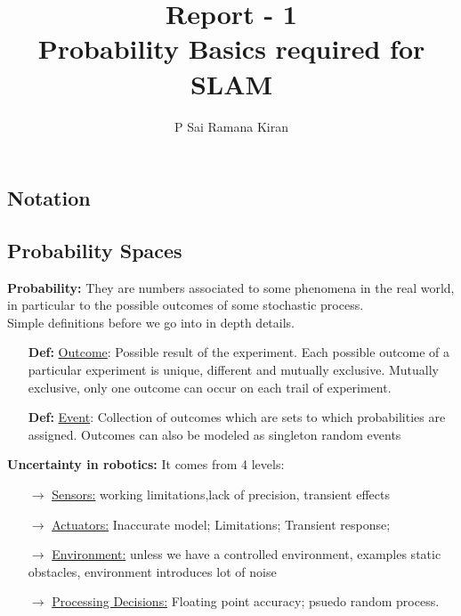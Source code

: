 \documentclass[12pt]{report} %
\title{Report - 1 \\ Probability Basics required for SLAM }
\author{P Sai Ramana Kiran}
\begin{document}
	\maketitle
	\newpage
	\begin{center}
		\section*{Notation}
	\end{center}
	\newpage
	\begin{center}
		\section*{Probability Spaces}
	\end{center}
	\textbf{Probability:}
	They are numbers associated to some phenomena in the real world, in particular to the possible outcomes of some stochastic process. \\
	
	\noindent
	Simple definitions before we go into in depth details. 
	\begin{itemize}[noitemsep,topsep=0pt]
		\item[\textbf{Def:}] \setul{1pt}{.4pt}\ul{Outcome}: Possible result of the experiment. Each possible outcome of a particular experiment is unique, different and mutually exclusive. Mutually exclusive, only one outcome can occur on each trail of experiment. \item[\textbf{Def:}] \setul{1pt}{.4pt}\ul{Event}: Collection of outcomes which are sets to which probabilities are assigned. Outcomes can also be modeled as singleton random events\\ 
		 
	\end{itemize}
	
	\noindent
	\textbf{Uncertainty in robotics:} It comes from 4 levels:
	\begin{itemize}[noitemsep,topsep=0pt]
	\item[$\rightarrow$] \setul{1pt}{.4pt}\ul{Sensors:} working
	limitations,lack of precision, transient effects   
	\item[$\rightarrow$] \setul{1pt}{.4pt}\ul{Actuators:} Inaccurate model; Limitations; Transient response;
	\item[$\rightarrow$] \setul{1pt}{.4pt}\ul{Environment:} unless we have a controlled environment, examples static obstacles, environment introduces lot of noise 
	\item[$\rightarrow$] \setul{1pt}{.4pt}\ul{Processing Decisions:} Floating point accuracy; psuedo random process.\\
	\end{itemize}
	
\end{document}

